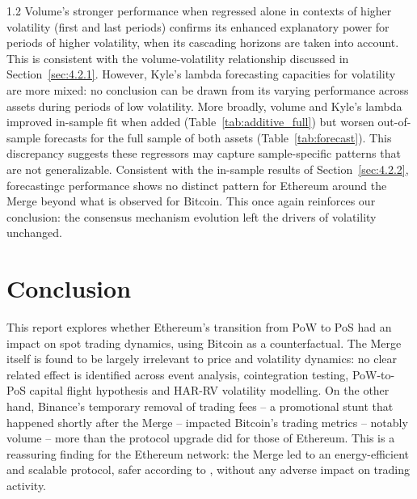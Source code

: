 \documentclass[10pt]{article}
\begin{document}
\begin{setstretch}{1.2}
Volume's stronger performance when regressed alone in contexts of higher volatility (first and last periods) confirms its enhanced explanatory power for periods of higher volatility, when its cascading horizons are taken into account. This is consistent with the volume-volatility relationship discussed in Section~\ref{sec:4.2.1}. However, Kyle's lambda forecasting capacities for volatility are more mixed: no conclusion can be drawn from its varying performance across assets during periods of low volatility. More broadly, volume and Kyle's lambda improved in-sample fit when added (Table~\ref{tab:additive_full}) but worsen out-of-sample forecasts for the full sample of both assets (Table~\ref{tab:forecast}). This discrepancy suggests these regressors may capture sample-specific patterns that are not generalizable. Consistent with the in-sample results of Section~\ref{sec:4.2.2}, forecastingc performance shows no distinct pattern for Ethereum around the Merge beyond what is observed for Bitcoin. This once again reinforces our conclusion: the consensus mechanism evolution left the drivers of volatility unchanged.

\section{Conclusion}
\label{sec:conclusion}



This report explores whether Ethereum's transition from PoW to PoS had an impact on spot trading dynamics, using Bitcoin as a counterfactual. The Merge itself is found to be largely irrelevant to price and volatility dynamics: no clear related effect is identified across event analysis, cointegration testing, PoW-to-PoS capital flight hypothesis and HAR-RV volatility modelling. On the other hand, Binance's temporary removal of trading fees -- a promotional stunt that happened shortly after the Merge -- impacted Bitcoin's trading metrics -- notably volume -- more than the protocol upgrade did for those of Ethereum. This is a reassuring finding for the Ethereum network: the Merge led to an energy-efficient and scalable protocol, safer according to \textcite{John2025}, without any adverse impact on trading activity. 


\end{setstretch}
\end{document}
